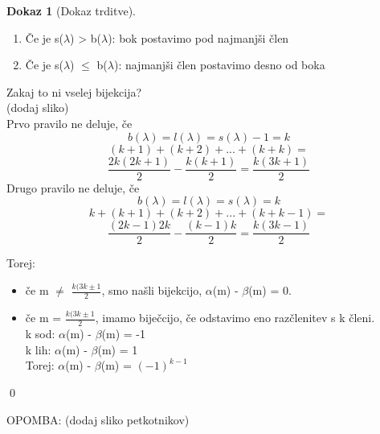 \documentclass[a4paper,12pt]{article}
\theoremstyle{definition}
\newtheorem{pro}[counter]{Dokaz}
\theoremstyle{remark}
\begin{document}
\begin{pro}[Dokaz trditve]
\begin{enumerate}
    \item Če je s($\lambda$) > b($\lambda$): bok postavimo pod najmanjši člen
    \item Če je s($\lambda$) $\leqslant$ b($\lambda$): najmanjši člen postavimo desno od boka
\end{enumerate}

Zakaj to ni vselej bijekcija?\\
(dodaj sliko)\\
Prvo pravilo ne deluje, če
\[b(\lambda) = l(\lambda) = s(\lambda) - 1 = k\]
\[(k + 1) + (k + 2) + ... + (k + k) =\]
\[\frac{2k (2k + 1)}{2} - \frac{k (k + 1)}{2} = \frac{k (3k + 1)}{2}\]
Drugo pravilo ne deluje, če
\[b(\lambda) = l(\lambda) = s(\lambda) = k\]
\[k + (k + 1) + (k + 2) + ... + (k + k - 1) =\]
\[\frac{(2k - 1) 2k}{2} - \frac{(k - 1) k}{2} = \frac{k (3k - 1)}{2}\]

Torej:\\
\begin{itemize}
    \item če m $\neq$ $\frac{k (3k \pm 1}{2}$, smo našli bijekcijo, $\alpha$(m) - $\beta$(m) = 0.
    \item če m = $\frac{k (3k \pm 1}{2}$, imamo biječcijo, če odstavimo eno razčlenitev s k členi.\\
    k sod: $\alpha$(m) - $\beta$(m) = -1\\
    k lih: $\alpha$(m) - $\beta$(m) = 1\\
    Torej: $\alpha$(m) - $\beta$(m) = $(-1)^{k - 1}$
\end{itemize}
\qed
\end{pro}

OPOMBA: (dodaj sliko petkotnikov)\\
\end{document}
